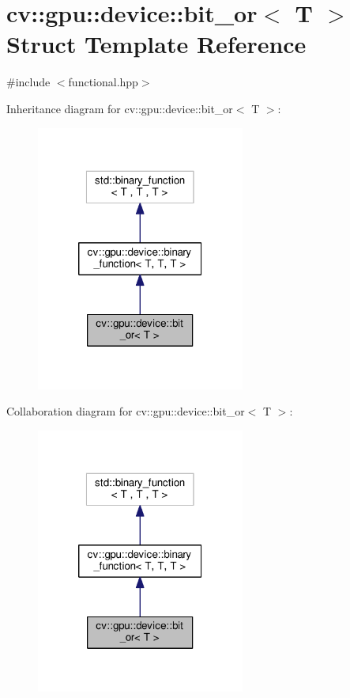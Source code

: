 \hypertarget{structcv_1_1gpu_1_1device_1_1bit__or}{\section{cv\-:\-:gpu\-:\-:device\-:\-:bit\-\_\-or$<$ T $>$ Struct Template Reference}
\label{structcv_1_1gpu_1_1device_1_1bit__or}
}


{\ttfamily \#include $<$functional.\-hpp$>$}



Inheritance diagram for cv\-:\-:gpu\-:\-:device\-:\-:bit\-\_\-or$<$ T $>$\-:\nopagebreak
\begin{figure}[H]
\begin{center}
\leavevmode
\includegraphics[width=194pt]{structcv_1_1gpu_1_1device_1_1bit__or__inherit__graph}
\end{center}
\end{figure}


Collaboration diagram for cv\-:\-:gpu\-:\-:device\-:\-:bit\-\_\-or$<$ T $>$\-:\nopagebreak
\begin{figure}[H]
\begin{center}
\leavevmode
\includegraphics[width=194pt]{structcv_1_1gpu_1_1device_1_1bit__or__coll__graph}
\end{center}
\end{figure}
